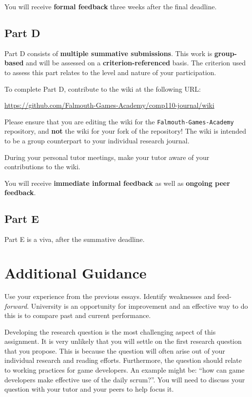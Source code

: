 \documentclass{../fal_assignment}
\begin{document}
You will receive \textbf{formal feedback} three weeks after the final deadline.

\subsection*{Part D}

Part D consists of \textbf{multiple summative submissions}. This work is \textbf{group-based} and will be assessed on a \textbf{criterion-referenced} basis.
The criterion used to assess this part relates to the level and nature of your participation.

To complete Part D, contribute to the wiki at the following URL:

\url{https://github.com/Falmouth-Games-Academy/comp110-journal/wiki}

Please ensure that you are editing the wiki for the \texttt{Falmouth-Games-Academy} repository,
and \textbf{not} the wiki for your fork of the repository!
The wiki is intended to be a group counterpart to your individual research journal. 

During your personal tutor meetings, make your tutor aware of your contributions to the wiki.

You will receive \textbf{immediate informal feedback} as well as \textbf{ongoing peer feedback}.

\subsection*{Part E}

Part E is a viva, after the summative deadline. 

\section*{Additional Guidance}

Use your experience from the previous essays. Identify weaknesses and feed-\textit{forward}. University is an opportunity for improvement and an effective way to do this is to compare past and current performance.

Developing the research question is the most challenging aspect of this assignment. It is very unlikely that you will settle on the first research question that you propose. This is because the question will often arise out of your individual research and reading efforts. Furthermore, the question should relate to working practices for game developers. An example might be: ``how can game developers make effective use of the daily scrum?''. You will need to discuss your question with your tutor and your peers to help focus it.
\end{document}
